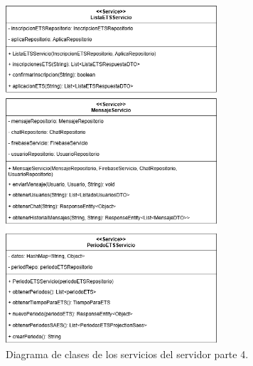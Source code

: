 \begin{figure}[htbp!]
	\begin{center}
		\includegraphics[width=0.7\textwidth]{Clases/Servicio4.png}
		\caption{Diagrama de clases de los servicios del servidor parte 4.}
		\label{fig:DS4}
	\end{center}
\end{figure}

